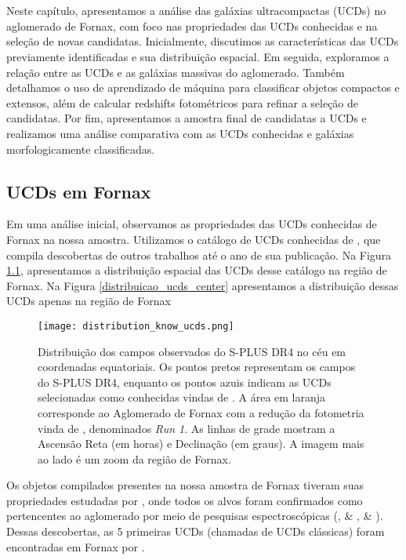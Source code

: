 \chapter{\chapternameanalysis}\label{analise}
Neste capítulo, apresentamos a análise das galáxias ultracompactas (UCDs) no aglomerado de Fornax, com foco nas propriedades das UCDs conhecidas e na seleção de novas candidatas. Inicialmente, discutimos as características das UCDs previamente identificadas e sua distribuição espacial. Em seguida, exploramos a relação entre as UCDs e as galáxias massivas do aglomerado. Também detalhamos o uso de aprendizado de máquina para classificar objetos compactos e extensos, além de calcular redshifts fotométricos para refinar a seleção de candidatas. Por fim, apresentamos a amostra final de candidatas a UCDs e realizamos uma análise comparativa com as UCDs conhecidas e galáxias morfologicamente classificadas.

\section{UCDs em Fornax}\label{sec:ucds_fornax}
Em uma análise inicial, observamos as propriedades das UCDs conhecidas de Fornax na nossa amostra. Utilizamos o catálogo de UCDs conhecidas de \cite{catalog_ucds}, que compila descobertas de outros trabalhos até o ano de sua publicação. Na Figura \ref{distribution_know_ucds}, apresentamos a distribuição espacial das UCDs desse catálogo na região de Fornax. Na Figura \ref{distribuicao_ucds_center} apresentamos a distribuição dessas UCDs apenas na região de Fornax

\begin{figure}[!ht]
    \centering
    \texttt{[image: distribution\_know\_ucds.png]}
    \caption[]{Distribuição dos campos observados do S-PLUS DR4 no céu em coordenadas equatoriais. Os pontos pretos representam os campos do S-PLUS DR4, enquanto os pontos azuis indicam as UCDs selecionadas como conhecidas vindas de \cite{catalog_ucds}. A área em laranja corresponde ao Aglomerado de Fornax com a redução da fotometria vinda de \cite{haack2024splusfornaxprojectsfp}, denominados \textit{Run 1}. As linhas de grade mostram a Ascensão Reta (em horas) e Declinação (em graus). A imagem mais ao lado é um zoom da região de Fornax.}
    \label{distribution_know_ucds}
\end{figure}

Os objetos compilados presentes na nossa amostra de Fornax tiveram suas propriedades estudadas por \cite{Mieske_2008_2}, onde todos os alvos foram confirmados como pertencentes ao aglomerado por meio de pesquisas espectroscópicas (\citealt{Drinkwater_2000}, \citealt{Mieske_2002} \& \citeyear{Mieske_2004}, \citealt{Richtler_2004} \& \citeyear{Richtler_2008}). Dessas descobertas, as 5 primeiras UCDs (chamadas de UCDs clássicas) foram encontradas em Fornax por \cite{Drinkwater_2000}.

